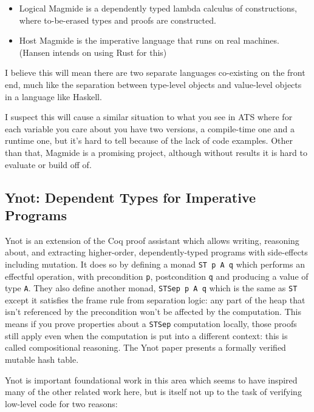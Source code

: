 \documentclass[12pt,twoside]{report}
\begin{document}
\begin{itemize}
  \item Logical Magmide is a dependently typed lambda calculus of constructions, where to-be-erased types and proofs are constructed.
  \item Host Magmide is the imperative language that runs on real machines. (Hansen intends on using Rust for this)
\end{itemize}

I believe this will mean there are two separate languages co-existing on the front end, much like the separation between type-level objects and value-level objects in a language like Haskell.

I suspect this will cause a similar situation to what you see in ATS where for each variable you care about you have two versions, a compile-time one and a runtime one, but it's hard to tell because of the lack of code examples. Other than that, Magmide is a promising project, although without results it is hard to evaluate or build off of.

\subsection{Ynot: Dependent Types for Imperative Programs}
Ynot\citep{nanevski_ynot_2008} is an extension of the Coq proof assistant which allows writing, reasoning about, and extracting higher-order, dependently-typed programs with side-effects including mutation. It does so by defining a monad \verb|ST p A q| which performs an effectful operation, with precondition \verb|p|, postcondition \verb|q| and producing a value of type \verb|A|. They also define another monad, \verb|STSep p A q| which is the same as \verb|ST| except it satisfies the frame rule from separation logic: any part of the heap that isn't referenced by the precondition won't be affected by the computation. This means if you prove properties about a \verb|STSep| computation locally, those proofs still apply even when the computation is put into a different context: this is called compositional reasoning. The Ynot paper presents a formally verified mutable hash table.

Ynot is important foundational work in this area which seems to have inspired many of the other related work here, but is itself not up to the task of verifying low-level code for two reasons:
\end{document}
